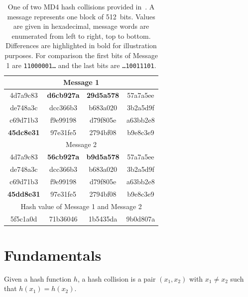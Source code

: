 \begin{table}[bt]
  \begin{center}
    \begin{tabular}{cccc}
      \hline \hline
      \multicolumn{4}{c}{Message 1} \\
      \hline
        4d7a9c83 & \textbf{d6cb927a} & \textbf{29d5a578} & 57a7a5ee \\
        de748a3c & dcc366b3 & b683a020 & 3b2a5d9f \\
        c69d71b3 & f9e99198 & d79f805e & a63bb2e8 \\
        \textbf{45dc8e31} & 97e31fe5 & 2794bf08 & b9e8c3e9 \\
      \hline
      \multicolumn{4}{c}{Message 2} \\
      \hline
        4d7a9c83 & \textbf{56cb927a} & \textbf{b9d5a578} & 57a7a5ee \\
        de748a3c & dcc366b3 & b683a020 & 3b2a5d9f \\
        c69d71b3 & f9e99198 & d79f805e & a63bb2e8 \\
        \textbf{45dd8e31} & 97e31fe5 & 2794bf08 & b9e8c3e9 \\
      \hline
      \multicolumn{4}{c}{Hash value of Message 1 and Message 2} \\
      \hline
        5f5c1a0d & 71b36046 & 1b5435da & 9b0d807a \\
      \hline \hline
    \end{tabular}
    \caption[Hexadecimal values of one MD4 collisions given in paper~\cite{wang2004}]{
      One of two MD4 hash collisions provided in~\cite{wang2004}.
      A message represents one block of 512~bits.
      Values are given in hexadecimal, message words are enumerated from
      left to right, top to bottom. Differences are highlighted in
      bold for illustration purposes. For comparison the first bits
      of Message 1 are \texttt{11000001\dots} and the last bits are
      \texttt{\dots10011101}.
    }
    \label{tab:wang-md4-collision1}
  \end{center}
\end{table}

\newpage
\section{Fundamentals}
\label{sec:dc-fundamentals}
%
\begin{defi}
  Given a hash function $h$,
  a hash collision is a pair $(x_1, x_2)$ with $x_1 \neq x_2$ such that
  $h(x_1) = h(x_2)$.
\end{defi}

